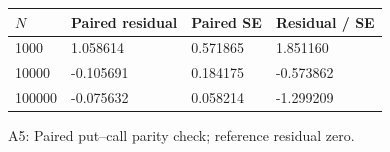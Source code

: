 \begin{center}
\small
\begin{tabular}{llll}
\toprule
$N$ & Paired residual & Paired SE & Residual / SE\\
\midrule
1000 & 1.058614 & 0.571865 & 1.851160\\
10000 & -0.105691 & 0.184175 & -0.573862\\
100000 & -0.075632 & 0.058214 & -1.299209\\
\bottomrule
\end{tabular}
\par\smallskip A5: Paired put--call parity check; reference residual zero.
\end{center}